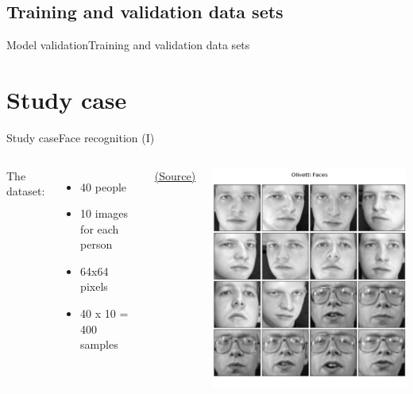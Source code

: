 \documentclass[10pt,compress]{beamer} %
\begin{document}
\subsection{Training and validation data sets}
\begin{frame}{Model validation}{Training and validation data sets}
	\small{
    	\begin{block}{}
       \vspace{-0.2cm}
       
       \vspace{-0.2cm}
    	\end{block}
		}
\end{frame}

\section{Study case}
\begin{frame}{Study case}{Face recognition (I)}
   \begin{columns}
	   The dataset:
	   \begin{itemize}
	   \item 40 people
	   \item 10 images for each person
	   \item 64x64 pixels
	   \item 40 x 10 = 400 samples
	   \end{itemize}
	\small \href{http://corpocrat.com/2014/10/10/tutorial-pybrain-neural-network-for-classifying-olivetti-faces/}{(Source)}
		\begin{center}
		\includegraphics[width=0.9\linewidth]{figs/faces.png}
		\end{center}
	\end{columns}
\end{frame}
\end{document}
